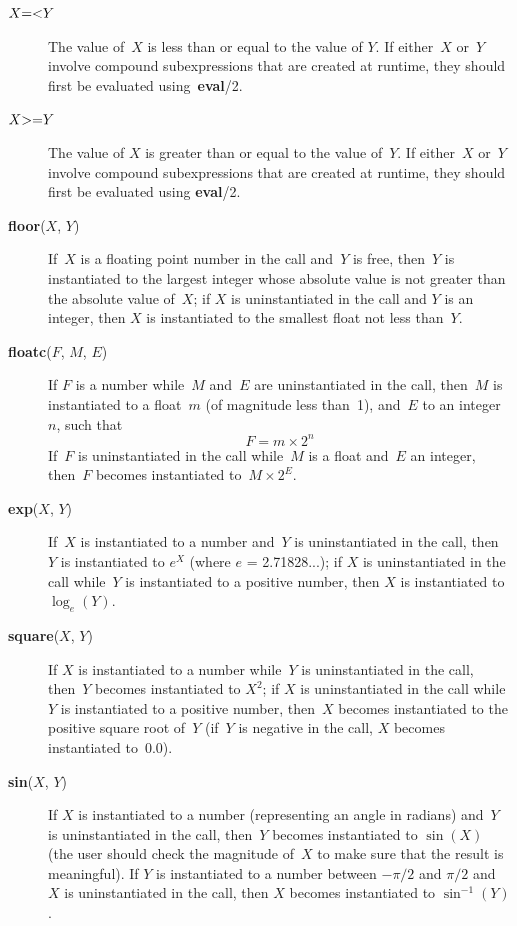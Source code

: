 \begin{description}
\item[$X {\bf =<} Y$] 
    The value of~$X$ is less than or equal to the value of $Y$.
    If either~$X$ or~$Y$ involve compound subexpressions
    that are created at runtime,
    they should first be evaluated using~{\bf eval}/2.

\item[$X {\bf >=} Y$] 
    The value of $X$ is greater than or equal to the value of~$Y$.
    If either~$X$ or~$Y$
    involve compound subexpressions that are created at runtime,
    they should first be evaluated using {\bf eval}/2.

\item[{\bf floor}($X$, $Y$)] 
    If~$X$ is a floating point number in the call and~$Y$ is free,
    then~$Y$ is instantiated to the largest integer whose absolute value
    is not greater than the absolute value of~$X$;
    if $X$ is uninstantiated in the call and $Y$ is an integer,
    then $X$ is instantiated to the smallest float not less than~$Y$.

\item[{\bf floatc}($F$, $M$, $E$)] 
    If $F$ is a number while~$M$ and~$E$ are uninstantiated in the call,
    then~$M$ is instantiated to a float~$m$ (of magnitude less than~1),
    and~$E$ to an integer~$n$, such that
    $$F = m \times 2^n$$
    If~$F$ is uninstantiated in the call while~$M$ is a float and~$E$
    an integer, then~$F$ becomes instantiated to~$M \times 2^E$.

\item[{\bf exp}($X$, $Y$)] 
    If~$X$ is instantiated to a number and~$Y$ is uninstantiated in the call,
    then~$Y$ is instantiated to $e^X$ (where $e$ = 2.71828...);
    if $X$ is uninstantiated in the call while~$Y$ is instantiated to a positive
    number, then $X$ is instantiated to $\log_e(Y)$.

\item[{\bf square}($X$, $Y$)] 
    If $X$ is instantiated to a number while~$Y$ is uninstantiated in the call,
    then~$Y$ becomes instantiated to $X^2$;
    if $X$ is uninstantiated in the call while $Y$ is instantiated
    to a positive number,
    then~$X$ becomes instantiated to the positive square root of~$Y$
    (if~$Y$ is negative in the call, $X$ becomes instantiated to~0.0).

\item[{\bf sin}($X$, $Y$)] 
    If $X$ is instantiated to a number (representing an angle in radians)
    and~$Y$ is uninstantiated in the call,
    then~$Y$ becomes instantiated to $\sin(X)$
    (the user should check the magnitude of~$X$ to make sure that the result
    is meaningful).
    If $Y$ is instantiated to a number between $-\pi/2$ and $\pi/2$
    and~$X$ is uninstantiated in the call,
    then $X$ becomes instantiated to $\sin^{-1}(Y)$.
\end{description}

